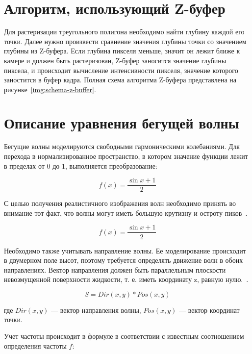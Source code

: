 \section{Алгоритм, использующий Z-буфер}
Для растеризации треугольного полигона необходимо найти глубину каждой его точки.
Далее нужно произвести сравнение значения глубины точки со значением глубины из Z-буфера. 
Если глубина пикселя меньше, значит он лежит ближе к камере и должен быть растеризован, 
Z-буфер заносится значение глубины пиксела, и происходит вычисление интенсивности пикселя, значение которого заностится в буфер кадра. 
Полная схема алгоритма Z-буфера представлена на рисунке~\ref{img:schema-z-buffer}.


\newpage

\section{Описание уравнения бегущей волны}
Бегущие волны моделируются свободными гармоническими колебаниями. 
Для перехода в нормализированное пространство, в котором значение функции лежит в пределах от 0 до 1, 
выполняется преобразование:

\begin{equation}
    f(x) = \dfrac{\sin{x} + 1}{2}
\end{equation}

С целью получения реалистичного изображения волн необходимо принять во внимание тот факт, 
что волны могут иметь большую крутизну и остроту пиков~\cite{WAVE}.

\begin{equation}
    f(x) = \dfrac{\sin{x} + 1}{2}
\end{equation}

Необходимо также учитывать направление волны. Ее моделирование происходит в двумерном поле высот, 
поэтому требуется определять движение волн в обоих направлениях. Вектор направления должен быть 
параллельным плоскости невозмущенной поверхности жидкости, т. е. иметь координату z, равную нулю.~\cite{WAVE}.

\begin{equation}
    S = Dir(x,y)*Pos(x,y)
\end{equation}

где $Dir(x, y)$ — вектор направления волны, $Pos(x, y)$ — вектор координат точки.

Учет частоты происходит в формуле в соответствии с известным соотношением определения частоты $f$:

